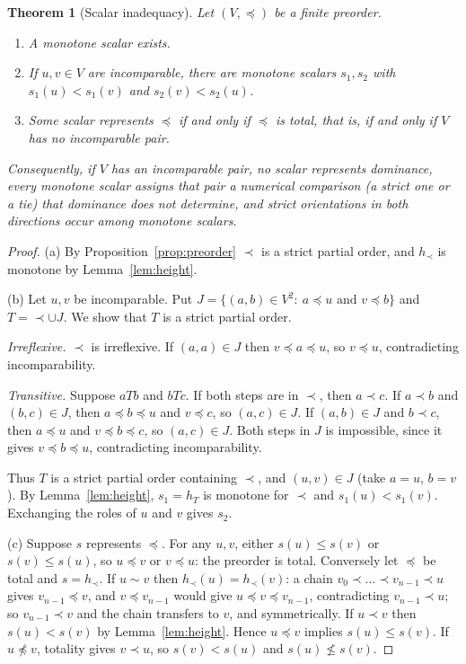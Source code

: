 \documentclass[11pt]{article}
\theoremstyle{plain}
\newtheorem{theorem}{Theorem}
\theoremstyle{definition}
\theoremstyle{remark}
\begin{document}
\begin{theorem}[Scalar inadequacy]\label{thm:noscalar}
Let $(V,\preceq)$ be a finite preorder.
\begin{enumerate}[label=(\alph*)]
\item A monotone scalar exists.
\item If $u,v\in V$ are incomparable, there are monotone scalars $s_1,s_2$ with $s_1(u)<s_1(v)$ and $s_2(v)<s_2(u)$.
\item Some scalar represents $\preceq$ if and only if $\preceq$ is total, that is, if and only if $V$ has no incomparable pair.
\end{enumerate}
Consequently, if $V$ has an incomparable pair, no scalar represents dominance, every monotone scalar assigns that pair a numerical comparison (a strict one or a tie) that dominance does not determine, and strict orientations in both directions occur among monotone scalars.
\end{theorem}

\begin{proof}
(a) By Proposition~\ref{prop:preorder} $\prec$ is a strict partial order, and $h_\prec$ is monotone by Lemma~\ref{lem:height}.

(b) Let $u,v$ be incomparable. Put $J=\{(a,b)\in V^2:\ a\preceq u\text{ and }v\preceq b\}$ and $T={\prec}\cup J$. We show that $T$ is a strict partial order.

\emph{Irreflexive.} $\prec$ is irreflexive. If $(a,a)\in J$ then $v\preceq a\preceq u$, so $v\preceq u$, contradicting incomparability.

\emph{Transitive.} Suppose $aTb$ and $bTc$. If both steps are in $\prec$, then $a\prec c$. If $a\prec b$ and $(b,c)\in J$, then $a\preceq b\preceq u$ and $v\preceq c$, so $(a,c)\in J$. If $(a,b)\in J$ and $b\prec c$, then $a\preceq u$ and $v\preceq b\preceq c$, so $(a,c)\in J$. Both steps in $J$ is impossible, since it gives $v\preceq b\preceq u$, contradicting incomparability.

Thus $T$ is a strict partial order containing $\prec$, and $(u,v)\in J$ (take $a=u$, $b=v$). By Lemma~\ref{lem:height}, $s_1=h_T$ is monotone for $\prec$ and $s_1(u)<s_1(v)$. Exchanging the roles of $u$ and $v$ gives $s_2$.

(c) Suppose $s$ represents $\preceq$. For any $u,v$, either $s(u)\le s(v)$ or $s(v)\le s(u)$, so $u\preceq v$ or $v\preceq u$: the preorder is total. Conversely let $\preceq$ be total and $s=h_\prec$. If $u\sim v$ then $h_\prec(u)=h_\prec(v)$: a chain $v_0\prec\dots\prec v_{n-1}\prec u$ gives $v_{n-1}\preceq v$, and $v\preceq v_{n-1}$ would give $u\preceq v\preceq v_{n-1}$, contradicting $v_{n-1}\prec u$; so $v_{n-1}\prec v$ and the chain transfers to $v$, and symmetrically. If $u\prec v$ then $s(u)<s(v)$ by Lemma~\ref{lem:height}. Hence $u\preceq v$ implies $s(u)\le s(v)$. If $u\not\preceq v$, totality gives $v\prec u$, so $s(v)<s(u)$ and $s(u)\not\le s(v)$.
\end{proof}
\end{document}
